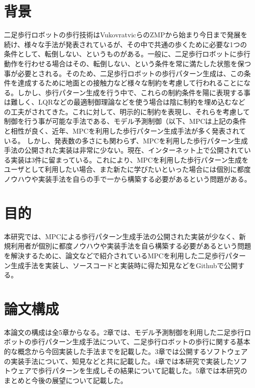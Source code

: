 
\section{背景}
二足歩行ロボットの歩行技術はVukovratvicらのZMP\cite{VUKOBRATOVIC19721}から始まり今日まで発展を続け、様々な手法が発表されているが、その中で共通の歩くために必要な1つの条件として、転倒しない、というものがある。一般に、二足歩行ロボットに歩行動作を行わせる場合はその、転倒しない、という条件を常に満たした状態を保つ事が必要とされる。そのため、二足歩行ロボットの歩行パターン生成は、この条件を達成するために地面との接触力など様々な制約を考慮して行われることになる。しかし、歩行パターン生成を行う中で、これらの制約条件を陽に表現する事は難しく、LQRなどの最適制御理論などを使う場合は陰に制約を埋め込むなどの工夫がされてきた。これに対して、明示的に制約を表現し、それらを考慮して制御を行う事が可能な手法である、モデル予測制御（以下、MPC\cite{MPC}は上記の条件と相性が良く、近年、MPCを利用した歩行パターン生成手法が多く発表されている。
しかし、発表数の多さにも関わらず、MPCを利用した歩行パターン生成手法の公開された実装は非常に少ない。現在、インターネット上で公開されている実装は3件\cite{GITHUB1}\cite{GITHUB2}\cite{GITHUB3}に留まっている。これにより、MPCを利用した歩行パターン生成をユーザとして利用したい場合、また新たに学びたいといった場合には個別に都度ノウハウや実装手法を自らの手で一から構築する必要があるという問題がある。

\section{目的}
本研究では、MPCによる歩行パターン生成手法の公開された実装が少なく、新規利用者が個別に都度ノウハウや実装手法を自ら構築する必要があるという問題を解決するために、論文などで紹介されているMPCを利用した二足歩行パターン生成手法を実装し、ソースコードと実装時に得た知見などをGithub\cite{MYGITHUB}で公開する。

\section{論文構成}
本論文の構成は全5章からなる。2章では、モデル予測制御を利用した二足歩行ロボットの歩行パターン生成手法について、二足歩行ロボットの歩行に関する基本的な概念から今回実装した手法までを記載した。3章では公開するソフトウェアの実装手法について、知見などと共に記載した。4章では本研究で実装したソフトウェアで歩行パターンを生成しその結果について記載した。5章では本研究のまとめと今後の展望について記載した。


\newpage

